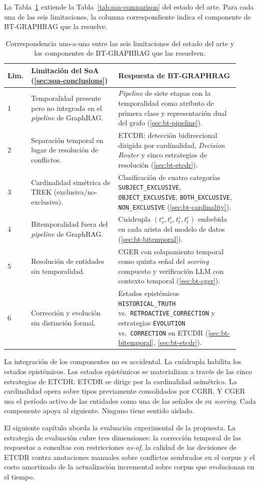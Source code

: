 La Tabla~\ref{tab:bt-vs-soa} extiende la Tabla~\ref{tab:soa-comparison} del estado del arte. Para cada una de las seis limitaciones, la columna correspondiente indica el componente de BT-GRAPHRAG que la resuelve.

\begin{table}[h]
\centering
\small
\begin{tabular}{p{0.06\linewidth}p{0.36\linewidth}p{0.50\linewidth}}
\hline
\textbf{Lim.} & \textbf{Limitación del SoA (\ref{sec:soa-conclusions})} & \textbf{Respuesta de BT-GRAPHRAG} \\ \hline
1 & Temporalidad presente pero no integrada en el \emph{pipeline} de GraphRAG. & \emph{Pipeline} de siete etapas con la temporalidad como atributo de primera clase y representación dual del grafo (\ref{sec:bt-pipeline}). \\
2 & Separación temporal en lugar de resolución de conflictos. & ETCDR: detección bidireccional dirigida por cardinalidad, \emph{Decision Router} y cinco estrategias de resolución (\ref{sec:bt-etcdr}). \\
3 & Cardinalidad simétrica de TREK (exclusiva/no-exclusiva). & Clasificación de cuatro categorías \texttt{SUBJECT\_EXCLUSIVE}, \texttt{OBJECT\_EXCLUSIVE}, \texttt{BOTH\_EXCLUSIVE}, \texttt{NON\_EXCLUSIVE} (\ref{sec:bt-cardinality}). \\
4 & Bitemporalidad fuera del \emph{pipeline} de GraphRAG. & Cuádrupla $(t_v^s, t_v^e, t_t^s, t_t^e)$ embebida en cada arista del modelo de datos (\ref{sec:bt-bitemporal}). \\
5 & Resolución de entidades sin temporalidad. & CGER con solapamiento temporal como quinta señal del \emph{scoring} compuesto y verificación LLM con contexto temporal (\ref{sec:bt-cger}). \\
6 & Corrección y evolución sin distinción formal. & Estados epistémicos \texttt{HISTORICAL\_TRUTH} vs.\ \texttt{RETROACTIVE\_CORRECTION} y estrategias \texttt{EVOLUTION} vs.\ \texttt{CORRECTION} en ETCDR (\ref{sec:bt-bitemporal}, \ref{sec:bt-etcdr}). \\ \hline
\end{tabular}
\caption{Correspondencia uno-a-uno entre las seis limitaciones del estado del arte y los componentes de BT-GRAPHRAG que las resuelven.}
\label{tab:bt-vs-soa}
\end{table}

La integración de los componentes no es accidental. La cuádrupla habilita los estados epistémicos. Los estados epistémicos se materializan a través de las cinco estrategias de ETCDR. ETCDR se dirige por la cardinalidad asimétrica. La cardinalidad opera sobre tipos previamente consolidados por CGRR. Y CGER usa el período activo de las entidades como una de las señales de su \emph{scoring}. Cada componente apoya al siguiente. Ninguno tiene sentido aislado.

El siguiente capítulo aborda la evaluación experimental de la propuesta. La estrategia de evaluación cubre tres dimensiones: la corrección temporal de las respuestas a consultas con restricciones \emph{as-of}, la calidad de las decisiones de ETCDR contra anotaciones manuales sobre conflictos sembrados en el corpus y el costo amortizado de la actualización incremental sobre corpus que evolucionan en el tiempo.
